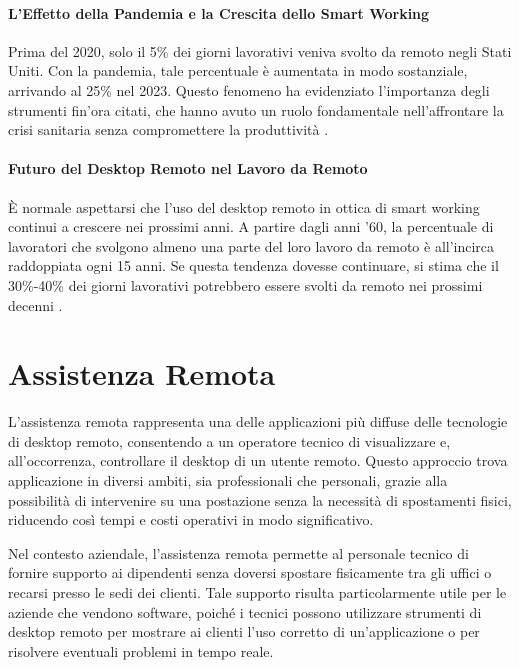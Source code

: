 \documentclass[12pt,a4paper,openright,twoside]{book}
\begin{document}
\paragraph{L'Effetto della Pandemia e la Crescita dello Smart Working}

Prima del 2020, solo il 5\% dei giorni lavorativi veniva svolto da remoto negli Stati Uniti. Con la pandemia, tale percentuale è aumentata in modo sostanziale, arrivando al 25\% nel 2023. Questo fenomeno ha evidenziato l'importanza degli strumenti fin'ora citati, che hanno avuto un ruolo fondamentale nell'affrontare la crisi sanitaria senza compromettere la produttività \cite{Barrero2023}.

\paragraph{Futuro del Desktop Remoto nel Lavoro da Remoto}
È normale aspettarsi che l'uso del desktop remoto in ottica di smart working continui a crescere nei prossimi anni. A partire dagli anni '60, la percentuale di lavoratori che svolgono almeno una parte del loro lavoro da remoto è all'incirca raddoppiata ogni 15 anni. Se questa tendenza dovesse continuare, si stima che il 30\%-40\% dei giorni lavorativi potrebbero essere svolti da remoto nei prossimi decenni \cite{Barrero2023}.



\section{Assistenza Remota}
\label{sec:remote-assistance}

L'assistenza remota rappresenta una delle applicazioni più diffuse delle tecnologie di desktop remoto, consentendo a un operatore tecnico di visualizzare e, all'occorrenza, controllare il desktop di un utente remoto. Questo approccio trova applicazione in diversi ambiti, sia professionali che personali, grazie alla possibilità di intervenire su una postazione senza la necessità di spostamenti fisici, riducendo così tempi e costi operativi in modo significativo.

Nel contesto aziendale, l'assistenza remota permette al personale tecnico di fornire supporto ai dipendenti senza doversi spostare fisicamente tra gli uffici o recarsi presso le sedi dei clienti. Tale supporto risulta particolarmente utile per le aziende che vendono software, poiché i tecnici possono utilizzare strumenti di desktop remoto per mostrare ai clienti l'uso corretto di un'applicazione o per risolvere eventuali problemi in tempo reale. 
\end{document}
